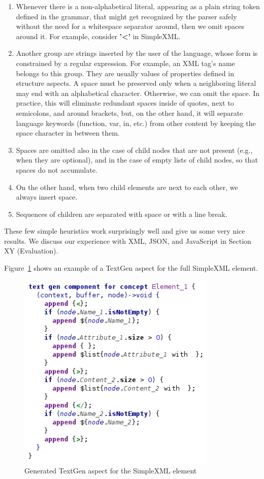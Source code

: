 \begin{enumerate}
	\item Whenever there is a non-alphabetical literal,	appearing as a plain string token defined in the grammar, that might get recognized by the parser safely without the need for a whitespace separator around, then we omit spaces around it.
		For example, consider \textbf{'\textless'} in SimpleXML.
	\item Another group are strings inserted by the user of the language, whose form is constrained by a regular expression.
		For example, an XML tag's name belongs to this group.
		They are usually values of properties defined in structure aspects.
		A space must be preserved only when a neighboring literal may end with an alphabetical character. Otherwise, we can omit the space.
		In practice, this will eliminate redundant spaces inside of quotes, next to semicolons, and around brackets, but, on the other hand, it will separate language keywords (function, var, in, etc.) from other content by keeping the space character in between them.
	\item Spaces are omitted also in the case of child nodes that are not present (e.g., when they are optional), and in the case of empty lists of child nodes, so that spaces do not accumulate.
	\item On the other hand, when two child elements are next to each other, we always insert space.
	\item Sequences of children are separated with space or with a line break.
\end{enumerate}
These few simple heuristics work surprisingly well and give us some very nice results.
We discuss our experience with XML, JSON, and JavaScript in Section XY (Evaluation).

Figure~\ref{fig:textgen_final} shows an example of a TextGen aspect for the full SimpleXML element.

\begin{figure}[ht]
	\centering
	\includegraphics[width=95mm]{./images/textgen_final.png}
	\caption{Generated TextGen aspect for the SimpleXML element}
	\label{fig:textgen_final}
\end{figure}

